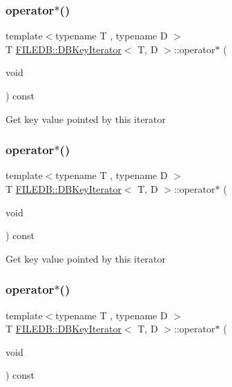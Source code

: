 \subsubsection{\texorpdfstring{operator$\ast$()}{operator*()}\hspace{0.1cm}{\footnotesize\ttfamily [1/3]}}
{\footnotesize\ttfamily template$<$typename T , typename D $>$ \\
T \mbox{\hyperlink{classFILEDB_1_1DBKeyIterator}{F\+I\+L\+E\+D\+B\+::\+D\+B\+Key\+Iterator}}$<$ T, D $>$\+::operator$\ast$ (\begin{DoxyParamCaption}\item[{void}]{ }\end{DoxyParamCaption}) const\hspace{0.3cm}{\ttfamily [inline]}}

Get key value pointed by this iterator \mbox{\label{classFILEDB_1_1DBKeyIterator_ab3cfba3f2b19b6eb74ff614c62195ab4}} 
\subsubsection{\texorpdfstring{operator$\ast$()}{operator*()}\hspace{0.1cm}{\footnotesize\ttfamily [2/3]}}
{\footnotesize\ttfamily template$<$typename T , typename D $>$ \\
T \mbox{\hyperlink{classFILEDB_1_1DBKeyIterator}{F\+I\+L\+E\+D\+B\+::\+D\+B\+Key\+Iterator}}$<$ T, D $>$\+::operator$\ast$ (\begin{DoxyParamCaption}\item[{void}]{ }\end{DoxyParamCaption}) const\hspace{0.3cm}{\ttfamily [inline]}}

Get key value pointed by this iterator \mbox{\label{classFILEDB_1_1DBKeyIterator_ab3cfba3f2b19b6eb74ff614c62195ab4}} 
\subsubsection{\texorpdfstring{operator$\ast$()}{operator*()}\hspace{0.1cm}{\footnotesize\ttfamily [3/3]}}
{\footnotesize\ttfamily template$<$typename T , typename D $>$ \\
T \mbox{\hyperlink{classFILEDB_1_1DBKeyIterator}{F\+I\+L\+E\+D\+B\+::\+D\+B\+Key\+Iterator}}$<$ T, D $>$\+::operator$\ast$ (\begin{DoxyParamCaption}\item[{void}]{ }\end{DoxyParamCaption}) const\hspace{0.3cm}{\ttfamily [inline]}}

